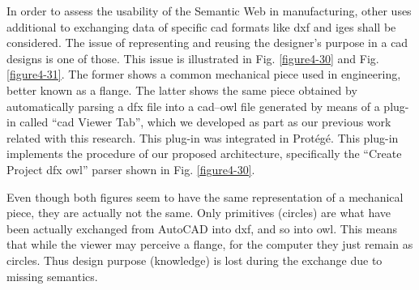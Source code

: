 In order to assess the usability of the Semantic Web in manufacturing, other uses additional to exchanging data of specific \gls{cad} formats like \gls{dxf} and \gls{iges} shall be considered. The issue of representing and reusing the designer’s purpose in a \gls{cad} designs is one of those. This issue is illustrated in Fig. \ref{figure4-30} and Fig. \ref{figure4-31}. The former shows a common mechanical piece used in engineering, better known as a flange. The latter shows the same piece obtained by automatically parsing a \gls{dfx} file into a \gls{cad}–\gls{owl} file generated by means of a plug-in called “\gls{cad} Viewer Tab”, which we developed as part as our previous work related with this research. This plug-in was integrated in Protégé. This plug-in implements the procedure   of our proposed architecture, specifically the “Create Project \gls{dfx}  \gls{owl}” parser shown in Fig. \ref{figure4-30}.

Even though both figures seem to have the same representation of a mechanical piece, they are actually not the same. Only primitives (circles) are what have been actually exchanged from AutoCAD into \gls{dxf}, and so into \gls{owl}. This means that while the viewer may perceive a flange, for the computer they just remain as circles. Thus design purpose (knowledge) is lost during the exchange due to missing semantics.



